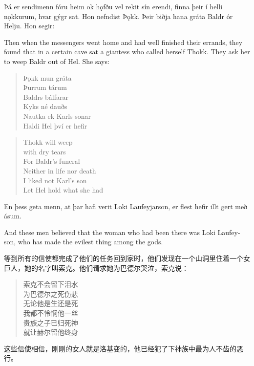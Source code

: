 \begin{paracol}{2}
  Þá er sendimenn fóru heim ok hǫfðu vel rekit sín erendi, finna þeir í helli nǫkkurum, hvar gýgr sat. Hon nefndist Þǫkk. Þeir biðja hana gráta Baldr ór Helju. Hon segir:

  \switchcolumn

  Then when the messengers went home and had well finished their errands, they found that in a certain cave sat a giantess who called herself Thokk. They ask her to weep Baldr out of Hel. She says:
  \switchcolumn*

  \begin{quote}
    Þǫkk mun gráta\\
    Þurrum tárum\\
    Baldrs bálfarar\\
    Kyks né dauðs\\
    Nautka ek Karls sonar\\
    Haldi Hel því er hefir
  \end{quote}

  \switchcolumn

  \begin{quote}
    Thokk will weep\\
    with dry tears\\
    For Baldr's funeral\\
    Neither in life nor death\\
    I liked not Karl's son\\
    Let Hel hold what she had
  \end{quote}

  \switchcolumn*
  En þess geta menn, at þar hafi verit Loki Laufeyjarson, er flest hefir illt gert með ásum.

  \switchcolumn

  And these men believed that the woman who had been there was Loki Laufey-son, who has made the evilest thing among the gods.
\end{paracol}
\begin{translation*}{}
  等到所有的信使都完成了他们的任务回到家时，他们发现在一个山洞里住着一个女巨人，她的名字叫索克。他们请求她为巴德尔哭泣，索克说：
  \begin{quote}
    索克不会留下泪水\\
    为巴德尔之死伤悲\\
    无论他是生还是死\\
    我都不怜悯他一丝\\
    贵族之子已归死神\\
    就让赫尔留他终身
  \end{quote}

  这些信使相信，刚刚的女人就是洛基变的，他已经犯了下神族中最为人不齿的恶行。
\end{translation*}
